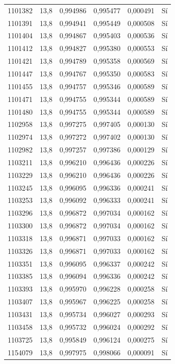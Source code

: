 \begin{longtable}{lccccc}
1101382 & 13,8 & 0,994986 & 0,995477 & 0,000491 & Sí \\
1101391 & 13,8 & 0,994941 & 0,995449 & 0,000508 & Sí \\
1101404 & 13,8 & 0,994867 & 0,995403 & 0,000536 & Sí \\
1101412 & 13,8 & 0,994827 & 0,995380 & 0,000553 & Sí \\
1101421 & 13,8 & 0,994789 & 0,995358 & 0,000569 & Sí \\
1101447 & 13,8 & 0,994767 & 0,995350 & 0,000583 & Sí \\
1101455 & 13,8 & 0,994757 & 0,995346 & 0,000589 & Sí \\
1101471 & 13,8 & 0,994755 & 0,995344 & 0,000589 & Sí \\
1101480 & 13,8 & 0,994755 & 0,995344 & 0,000589 & Sí \\
1102958 & 13,8 & 0,997275 & 0,997405 & 0,000130 & Sí \\
1102974 & 13,8 & 0,997272 & 0,997402 & 0,000130 & Sí \\
1102982 & 13,8 & 0,997257 & 0,997386 & 0,000129 & Sí \\
1103211 & 13,8 & 0,996210 & 0,996436 & 0,000226 & Sí \\
1103229 & 13,8 & 0,996210 & 0,996436 & 0,000226 & Sí \\
1103245 & 13,8 & 0,996095 & 0,996336 & 0,000241 & Sí \\
1103253 & 13,8 & 0,996092 & 0,996333 & 0,000241 & Sí \\
1103296 & 13,8 & 0,996872 & 0,997034 & 0,000162 & Sí \\
1103300 & 13,8 & 0,996872 & 0,997034 & 0,000162 & Sí \\
1103318 & 13,8 & 0,996871 & 0,997033 & 0,000162 & Sí \\
1103326 & 13,8 & 0,996871 & 0,997033 & 0,000162 & Sí \\
1103351 & 13,8 & 0,996095 & 0,996337 & 0,000242 & Sí \\
1103385 & 13,8 & 0,996094 & 0,996336 & 0,000242 & Sí \\
1103393 & 13,8 & 0,995970 & 0,996228 & 0,000258 & Sí \\
1103407 & 13,8 & 0,995967 & 0,996225 & 0,000258 & Sí \\
1103431 & 13,8 & 0,995734 & 0,996027 & 0,000293 & Sí \\
1103458 & 13,8 & 0,995732 & 0,996024 & 0,000292 & Sí \\
1103725 & 13,8 & 0,995849 & 0,996124 & 0,000275 & Sí \\
1154079 & 13,8 & 0,997975 & 0,998066 & 0,000091 & Sí \\

\end{longtable}
